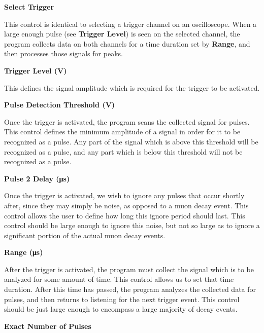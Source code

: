 \documentclass{../lab}
\begin{document}
\textbf{Select Trigger}

This control is identical to selecting a trigger channel on an oscilloscope. When a large enough pulse (see \textbf{Trigger Level}) is seen on the selected channel, the program collects data on both channels for a time duration set by \textbf{Range}, and then processes those signals for peaks.

\textbf{Trigger Level (V)}

This defines the signal amplitude which is required for the trigger to be activated.

\textbf{Pulse Detection Threshold (V)}

Once the trigger is activated, the program scans the collected signal for pulses. This control defines the minimum amplitude of a signal in order for it to be recognized as a pulse. Any part of the signal which is above this threshold will be recognized as a pulse, and any part which is below this threshold will not be recognized as a pulse.

\textbf{Pulse 2 Delay (μs)}

Once the trigger is activated, we wish to ignore any pulses that occur shortly after, since they may simply be noise, as opposed to a muon decay event. This control allows the user to define how long this ignore period should last. This control should be large enough to ignore this noise, but not so large as to ignore a significant portion of the actual muon decay events.

\textbf{Range (μs)}

After the trigger is activated, the program must collect the signal which is to be analyzed for some amount of time. This control allows us to set that time duration. After this time has passed, the program analyzes the collected data for pulses, and then returns to listening for the next trigger event. This control should be just large enough to encompass a large majority of decay events.

\textbf{Exact Number of Pulses}
\end{document}
